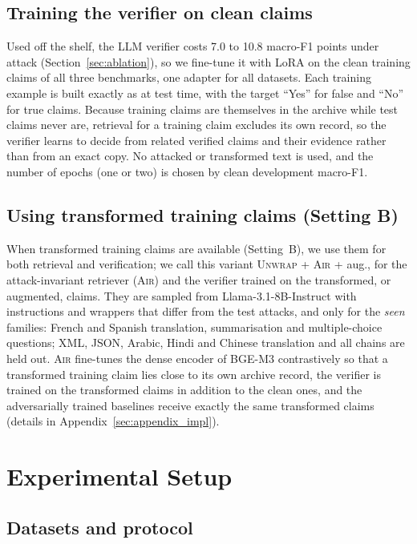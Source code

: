 \documentclass[11pt]{article}
\newcommand{\method}{\textsc{Unwrap}}
\newcommand{\air}{\textsc{Air}}
\begin{document}
\subsection{Training the verifier on clean claims}

Used off the shelf, the LLM verifier costs 7.0 to 10.8 macro-F1 points under attack (Section~\ref{sec:ablation}), so we fine-tune it with LoRA \citep{hu2022lora} on the clean training claims of all three benchmarks, one adapter for all datasets. Each training example is built exactly as at test time, with the target ``Yes'' for false and ``No'' for true claims. Because training claims are themselves in the archive while test claims never are, retrieval for a training claim excludes its own record, so the verifier learns to decide from related verified claims and their evidence rather than from an exact copy. No attacked or transformed text is used, and the number of epochs (one or two) is chosen by clean development macro-F1.

\subsection{Using transformed training claims (Setting B)}

When transformed training claims are available (Setting~B), we use them for both retrieval and verification; we call this variant \method{} + \air{} + aug., for the attack-invariant retriever (\air{}) and the verifier trained on the transformed, or augmented, claims. They are sampled from Llama-3.1-8B-Instruct \citep{grattafiori2024llama3} with instructions and wrappers that differ from the test attacks, and only for the \emph{seen} families: French and Spanish translation, summarisation and multiple-choice questions; XML, JSON, Arabic, Hindi and Chinese translation and all chains are held out. \air{} fine-tunes the dense encoder of BGE-M3 contrastively \citep{henderson2017efficient,reimers2019sbert} so that a transformed training claim lies close to its own archive record, the verifier is trained on the transformed claims in addition to the clean ones, and the adversarially trained baselines receive exactly the same transformed claims (details in Appendix~\ref{sec:appendix_impl}).

\section{Experimental Setup}

\subsection{Datasets and protocol}
\end{document}
